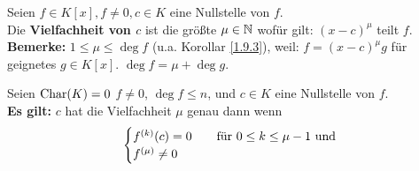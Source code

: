 \begin{subdefinition}
	Seien $ f \in K[x], f\neq 0, c \in K $ eine Nullstelle von $ f $.\\
	Die \textbf{Vielfachheit von $ c $} ist die größte $ \mu \in \mathbb{N}  $ wofür gilt: $ (x - c)^{\mu} $ teilt $ f $.\\
	\textbf{Bemerke:} $ 1 \leq \mu \leq \deg f $ (u.a. Korollar \ref{1.9.3}),
	weil: $ f = (x - c)^{\mu} g $ für geignetes $ g \in K[x] $. $ \deg f = \mu + \deg g $.
\end{subdefinition}

\begin{subtheorem}
	Seien $ \operatorname{Char}(K) = 0 $ $ f \neq 0 $, $ \deg f \leq n $, und $ c \in K $ eine Nullstelle von $ f $.\\
	\textbf{Es gilt:} $ c $ hat die Vielfachheit $ \mu $ genau dann wenn
	\[
		\begin{cases}
			f^{(k)} (c) = 0 &\quad \text{für $ 0 \leq k \leq \mu - 1 $ und} \\
			f^{(\mu)} \neq 0
		\end{cases}
	\]
\end{subtheorem}
